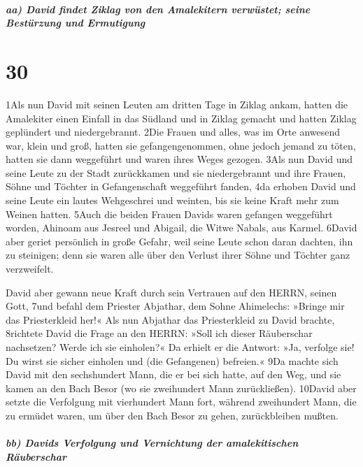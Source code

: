 \hypertarget{aa-david-findet-ziklag-von-den-amalekitern-verwuxfcstet-seine-bestuxfcrzung-und-ermutigung}{%
\subparagraph{aa) David findet Ziklag von den Amalekitern verwüstet;
seine Bestürzung und
Ermutigung}\label{aa-david-findet-ziklag-von-den-amalekitern-verwuxfcstet-seine-bestuxfcrzung-und-ermutigung}}

\hypertarget{section-29}{%
\section{30}\label{section-29}}

1Als nun David mit seinen Leuten am dritten Tage in Ziklag ankam, hatten
die Amalekiter einen Einfall in das Südland und in Ziklag gemacht und
hatten Ziklag geplündert und niedergebrannt. 2Die Frauen und alles, was
im Orte anwesend war, klein und groß, hatten sie gefangengenommen, ohne
jedoch jemand zu töten, hatten sie dann weggeführt und waren ihres Weges
gezogen. 3Als nun David und seine Leute zu der Stadt zurückkamen und sie
niedergebrannt und ihre Frauen, Söhne und Töchter in Gefangenschaft
weggeführt fanden, 4da erhoben David und seine Leute ein lautes
Wehgeschrei und weinten, bis sie keine Kraft mehr zum Weinen hatten.
5Auch die beiden Frauen Davids waren gefangen weggeführt worden, Ahinoam
aus Jesreel und Abigail, die Witwe Nabals, aus Karmel. 6David aber
geriet persönlich in große Gefahr, weil seine Leute schon daran dachten,
ihn zu steinigen; denn sie waren alle über den Verlust ihrer Söhne und
Töchter ganz verzweifelt.

David aber gewann neue Kraft durch sein Vertrauen auf den HERRN, seinen
Gott, 7und befahl dem Priester Abjathar, dem Sohne Ahimelechs: »Bringe
mir das Priesterkleid her!« Als nun Abjathar das Priesterkleid zu David
brachte, 8richtete David die Frage an den HERRN: »Soll ich dieser
Räuberschar nachsetzen? Werde ich sie einholen?« Da erhielt er die
Antwort: »Ja, verfolge sie! Du wirst sie sicher einholen und (die
Gefangenen) befreien.« 9Da machte sich David mit den sechshundert Mann,
die er bei sich hatte, auf den Weg, und sie kamen an den Bach Besor (wo
sie zweihundert Mann zurückließen). 10David aber setzte die Verfolgung
mit vierhundert Mann fort, während zweihundert Mann, die zu ermüdet
waren, um über den Bach Besor zu gehen, zurückbleiben mußten.

\hypertarget{bb-davids-verfolgung-und-vernichtung-der-amalekitischen-ruxe4uberschar}{%
\subparagraph{bb) Davids Verfolgung und Vernichtung der amalekitischen
Räuberschar}\label{bb-davids-verfolgung-und-vernichtung-der-amalekitischen-ruxe4uberschar}}

